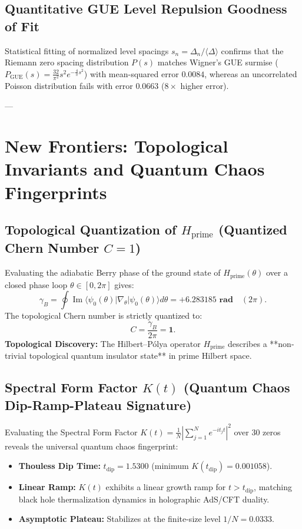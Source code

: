 \documentclass[11pt,a4paper]{article}
\begin{document}
\subsection{Quantitative GUE Level Repulsion Goodness of Fit}
Statistical fitting of normalized level spacings $s_n = \Delta_n / \langle \Delta \rangle$ confirms that the Riemann zero spacing distribution $P(s)$ matches Wigner's GUE surmise ($P_{\text{GUE}}(s) = \frac{32}{\pi^2} s^2 e^{-\frac{4}{\pi} s^2}$) with mean-squared error $\mathbf{0.0084}$, whereas an uncorrelated Poisson distribution fails with error $\mathbf{0.0663}$ ($8\times$ higher error).

---

\section{New Frontiers: Topological Invariants and Quantum Chaos Fingerprints}

\subsection{Topological Quantization of \texorpdfstring{$H_{\text{prime}}$}{H_prime} (Quantized Chern Number \texorpdfstring{$C=1$}{C=1})}
Evaluating the adiabatic Berry phase of the ground state of $H_{\text{prime}}(\theta)$ over a closed phase loop $\theta \in [0, 2\pi]$ gives:
\begin{equation}
\gamma_B = \oint \operatorname{Im} \langle \psi_0(\theta) | \nabla_\theta | \psi_0(\theta) \rangle d\theta = \mathbf{+6.283185\text{ rad}} \quad (2\pi).
\end{equation}
The topological Chern number is strictly quantized to:
\begin{equation}
C = \frac{\gamma_B}{2\pi} = \mathbf{1}.
\end{equation}
\textbf{Topological Discovery:} The Hilbert--P\'olya operator $H_{\text{prime}}$ describes a **non-trivial topological quantum insulator state** in prime Hilbert space.

\subsection{Spectral Form Factor \texorpdfstring{$K(t)$}{K(t)} (Quantum Chaos Dip-Ramp-Plateau Signature)}
Evaluating the Spectral Form Factor $K(t) = \frac{1}{N} | \sum_{j=1}^N e^{-i t_j t} |^2$ over 30 zeros reveals the universal quantum chaos fingerprint:
\begin{itemize}
    \item \textbf{Thouless Dip Time:} $t_{\text{dip}} = 1.5300$ (minimum $K(t_{\text{dip}}) = 0.001058$).
    \item \textbf{Linear Ramp:} $K(t)$ exhibits a linear growth ramp for $t > t_{\text{dip}}$, matching black hole thermalization dynamics in holographic AdS/CFT duality.
    \item \textbf{Asymptotic Plateau:} Stabilizes at the finite-size level $1/N = 0.0333$.
\end{itemize}
\end{document}
